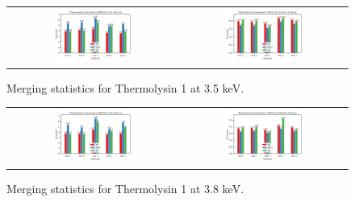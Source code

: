 \begin{figure}
    \centering
    \begin{tabular}{cc}
    \includegraphics[width = 0.5\textwidth]{plots/exp1/tlys_9_P6122/3p5_I_over_sigma.png} & \includegraphics[width = 0.5\textwidth]{plots/exp1/tlys_9_P6122/3p5_rmerges.png}
    \end{tabular}
    \caption{Merging statistics for Thermolysin 1 at 3.5 \unit{keV}.}
    \label{fig:tlys_9_3p5}
\end{figure}

\begin{figure}[h]
    \centering
    \begin{tabular}{cc}
    \includegraphics[width = 0.5\textwidth]{plots/exp1/tlys_9_P6122/3p8_I_over_sigma.png} & \includegraphics[width = 0.5\textwidth]{plots/exp1/tlys_9_P6122/3p8_rmerges.png}
    \end{tabular}
    \caption{Merging statistics for Thermolysin 1 at 3.8 \unit{keV}.}
    \label{fig:tlys_9_3p8}
\end{figure}

